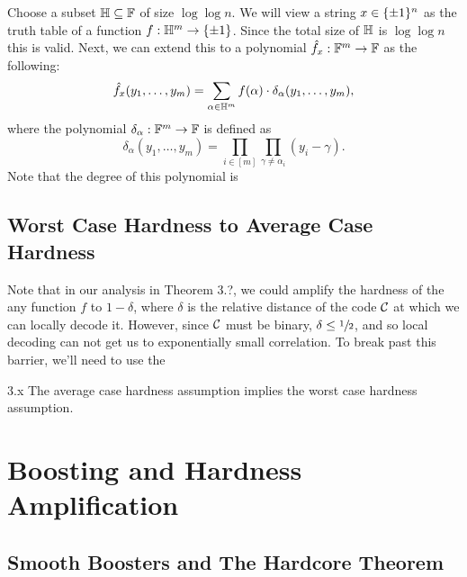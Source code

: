\documentclass[11pt]{article}
\begin{document}
Choose a subset $\mathbb{H} \subseteq \mathbb{F}$ of size $\log \log n$. We will view a string $x \in \{\pm 1\}^n$ as the truth table of a function $f : \mathbb{H}^{m} \rightarrow \{\pm 1\}$. Since the total size of $\mathbb{H}$ is $\log \log n$ this is valid. Next, we can extend this to a polynomial $\hat{f}_x : \mathbb{F}^m \rightarrow \mathbb{F}$ as the following:
\begin{equation*}
    \hat{f}_x(y_1, \ldots, y_m) = \sum_{\alpha \in \mathbb{H}^m}f(\alpha) \cdot \delta_\alpha(y_1, \ldots, y_m),
\end{equation*} 
where the polynomial $\delta_\alpha : \mathbb{F}^m \rightarrow \mathbb{F}$ is defined as 
\begin{equation*}
    \delta_\alpha(y_1, \ldots, y_m) = \prod_{i \in [m]} \prod_{\gamma \neq \alpha_i} (y_i - \gamma). 
\end{equation*}
Note that the degree of this polynomial is 

\subsection{Worst Case Hardness to Average Case Hardness}

Note that in our analysis in Theorem 3.?, we could amplify the hardness of the any function $f$ to $1 - \delta$, where $\delta$ is the relative distance of the code $\mathcal{C}$ at which we can locally decode it. However, since $\mathcal{C}$ must be binary, $\delta \leq \sfrac{1}{2}$, and so local decoding can not get us to exponentially small correlation. To break past this barrier, we'll need to use the 

\begin{theorem}{3.x}
    The average case hardness assumption implies the worst case hardness assumption.
\end{theorem}



\section{Boosting and Hardness Amplification}

\subsection{Smooth Boosters and The Hardcore Theorem}
\end{document}
